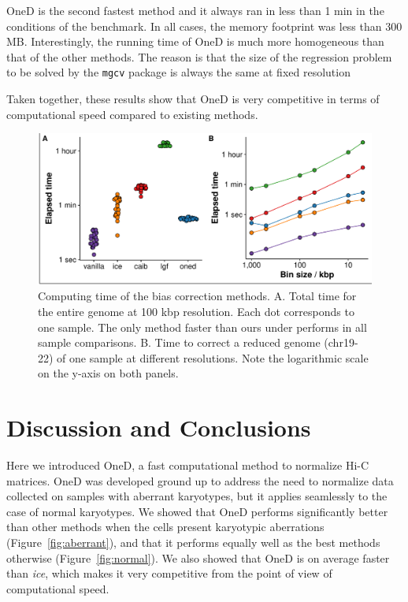 \documentclass{bioinfo}
\begin{document}
OneD is the second fastest method and it always ran in less than 1 min in
the conditions of the benchmark. In all cases, the memory footprint was
less than 300 MB. Interestingly, the running time of OneD is much more
homogeneous than that of the other methods. The reason is that the size of
the regression problem to be solved by the \texttt{mgcv} package is always
the same at fixed resolution

Taken together, these results show that OneD is very competitive in terms
of computational speed compared to existing methods.

\begin{figure}
\centerline{\includegraphics[width=.5\textwidth]
  {img/figure_benchmark_time.pdf}}
\caption{
Computing time of the bias correction methods. A. Total time for the entire genome at 100 kbp resolution. Each dot corresponds to
one sample. The only method faster than ours under performs in all sample
comparisons. B. Time to correct a reduced genome (chr19-22) of one sample at different resolutions. Note the logarithmic scale on the y-axis on both panels.}
\label{fig:times}
\end{figure}






\section{Discussion and Conclusions}

Here we introduced OneD, a fast computational method to normalize Hi-C
matrices. OneD was developed ground up to address the need to normalize
data collected on samples with aberrant karyotypes, but it applies
seamlessly to the case of normal karyotypes. We showed that OneD performs
significantly better than other methods when the cells present karyotypic
aberrations (Figure~\ref{fig:aberrant}), and that it performs equally well
as the best methods otherwise (Figure~\ref{fig:normal}). We also showed
that OneD is on average faster than \textit{ice}, which makes it very
competitive from the point of view of computational speed.
\end{document}
